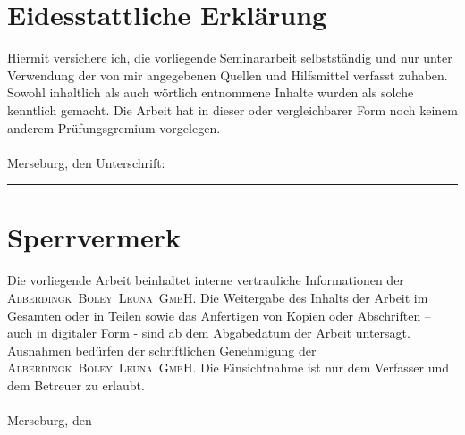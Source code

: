 \section*{Eidesstattliche Erklärung}
Hiermit versichere ich, die vorliegende Seminararbeit selbstständig und nur unter Verwendung der von mir angegebenen Quellen und Hilfsmittel verfasst zuhaben. Sowohl inhaltlich als auch wörtlich entnommene Inhalte wurden als solche kenntlich gemacht. Die Arbeit hat in dieser oder vergleichbarer Form noch keinem anderem Prüfungsgremium vorgelegen.\\ \\

Merseburg, den \todayDE \hfill Unterschrift:\rule{6cm}{0,3mm}

\vfill

\section*{Sperrvermerk}
Die vorliegende Arbeit beinhaltet interne vertrauliche Informationen der \linebreak \textsc{\mbox{Alberdingk Boley Leuna GmbH}}. Die Weitergabe des Inhalts der Arbeit im Gesamten oder in Teilen sowie das Anfertigen von Kopien oder Abschriften – auch in digitaler Form -  sind ab dem Abgabedatum der Arbeit untersagt. Ausnahmen bedürfen der schriftlichen Genehmigung der \textsc{\mbox{Alberdingk Boley Leuna GmbH}}. Die Einsichtnahme ist nur dem Verfasser und dem Betreuer zu erlaubt. \\ \\

Merseburg, den \todayDE 

\vfill

\cleardoubleoddpage